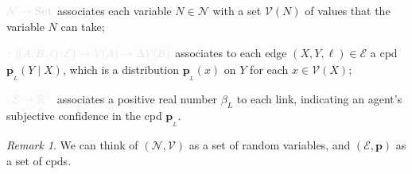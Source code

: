 \documentclass{article}
\theoremstyle{plain}
\theoremstyle{definition}
\theoremstyle{remark}
\newtheorem*{remark}{Remark}
\newcommand\mat[1]{\mathbf{#1}}
\newcommand{\notation}[2][]{#1}
\renewcommand{\notation}[2][]{{\color{notationcolor} #2}}
\newcommand{\bp}[1][L]{\mat{p}_{\!_{#1}\!}}
\newcommand{\V}{\mathcal V}
\newcommand{\N}{\mathcal N}
\newcommand{\Ed}{\mathcal E}
\newcommand{\MN}{PDG}
\numberwithin{equation}{section}
\begin{document}
\begin{defn}[\MN]
\begin{description}[nosep]
			\item[$\V$] $\notation{\N \to \mathbf{Set}}$
                          associates each variable $N \in \N$ with a set
                          $\V(N)$ of values that the variable $N$ can take;
          	\item[$\mat p$] $\notation{\colon \big(\!({A,B,\ell})\colon \! \Ed \big) \to \V(A) \to \Delta\V(B)}$
			associates to each edge $(X,Y,\ell) \in \Ed$ a cpd $\bp(Y \mid X)$, which is a distribution $\bp(x)$ on $Y$ for each $x \in \V(X)$;
 			
 			\item[$\beta$] $\notation{:\Ed \to \mathbb R^+ }$ associates a positive real number $\beta_L$ to each link, indicating an agent's subjective confidence in the cpd $\bp$.
		\end{description}
	\end{defn}
	\begin{vfull}
	\begin{remark}
		We can think of $(\N, \V)$ as a set of random variables, and $(\Ed,\mat p)$ as a set of cpds.
	\end{remark}
	\end{vfull}
\end{document}
